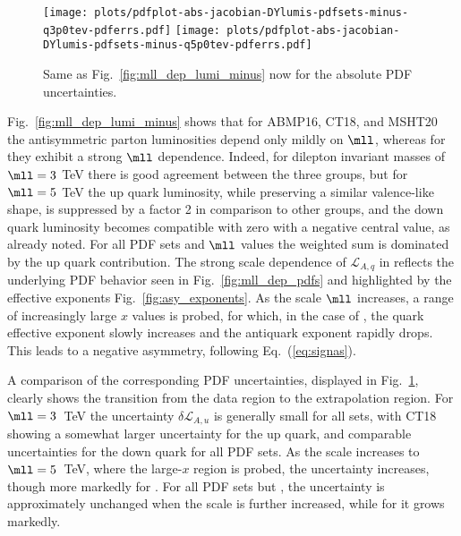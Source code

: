 \begin{figure}[!t]
 \centering
 \texttt{[image: plots/pdfplot-abs-jacobian-DYlumis-pdfsets-minus-q3p0tev-pdferrs.pdf]}
 \texttt{[image: plots/pdfplot-abs-jacobian-DYlumis-pdfsets-minus-q5p0tev-pdferrs.pdf]}
 \caption{Same as Fig.~\ref{fig:mll_dep_lumi_minus} now for the absolute PDF uncertainties.
    }    
 \label{fig:mll_dep_lumi_minus_pdferrs}
\end{figure}

Fig.~\ref{fig:mll_dep_lumi_minus} shows that for ABMP16, CT18, and
MSHT20 the antisymmetric
parton luminosities depend only mildly on $\mll$, whereas for 
they exhibit a strong $\mll$ dependence.
%
Indeed, for dilepton invariant masses of $\mll=3$ TeV there is good
agreement between the three groups, but
for $\mll=5$ TeV the  up quark luminosity, while preserving a
similar valence-like shape, is suppressed
by a factor 2 in comparison  to other groups, and the down quark luminosity becomes compatible with zero with a negative
central value,  as already noted. 
%
For all PDF sets and  $\mll$ values the weighted sum is dominated by the up quark contribution.
The strong scale dependence of $\mathcal{L}_{A,q}$ in 
reflects the underlying PDF behavior seen in  Fig.~\ref{fig:mll_dep_pdfs}
and highlighted by the effective exponents Fig.~\ref{fig:asy_exponents}.
%
As the scale $\mll$ increases, a range of increasingly large $x$ values is probed,
for which, in the case of
, the quark effective exponent slowly increases and the
antiquark exponent rapidly drops.
%
This leads to a negative asymmetry, 
following  Eq.~(\ref{eq:signas}). 

A comparison of the corresponding PDF uncertainties, displayed in
Fig.~\ref{fig:mll_dep_lumi_minus_pdferrs}, clearly shows the transition
from the data region to the extrapolation region.
%
For
$\mll=3$~TeV the uncertainty $\delta \mathcal{L}_{A,u}$ is generally
small for all sets, with CT18
showing a somewhat larger uncertainty for the up quark, and comparable
uncertainties for the down quark for all PDF sets.
%
As the scale  increases to $\mll=5$~TeV, where the large-$x$ region is
probed,  the uncertainty 
increases, though more markedly for .
%
For all PDF sets but
, the
uncertainty is approximately unchanged when the scale is further increased,
while for  it grows markedly.

